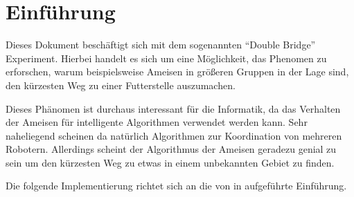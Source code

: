 
\section{Einführung}

Dieses Dokument beschäftigt sich mit dem sogenannten "`Double Bridge"'
Experiment. Hierbei handelt es sich um eine Möglichkeit, das Phenomen
zu erforschen, warum beispielsweise Ameisen in größeren Gruppen in der
Lage sind, den kürzesten Weg zu einer Futterstelle auszumachen.

Dieses Phänomen ist durchaus interessant für die Informatik, da das
Verhalten der Ameisen für intelligente Algorithmen verwendet werden
kann. Sehr naheliegend scheinen da natürlich Algorithmen zur
Koordination von mehreren Robotern. Allerdings scheint der Algorithmus
der Ameisen geradezu genial zu sein um den kürzesten Weg zu etwas in einem
unbekannten Gebiet zu finden.

Die folgende Implementierung richtet sich an die von \citeauthor{kramer2009computational} in \cite{kramer2009computational}
aufgeführte Einführung.
